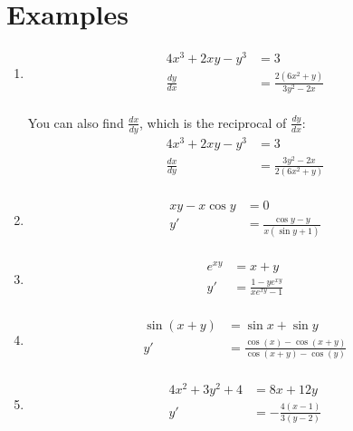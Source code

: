 \documentclass[letterpaper, landscape]{exam}
\begin{document}
  \newpage

  \section{Examples} %
  
  \begin{enumerate}
    \item 
      \begin{align*}
        4x^3 + 2xy - y^3 & = 3 \\
        \frac{dy}{dx}    & = \frac{2 \left(6x^2 + y\right)}{3 y^2 - 2x } \\
      \end{align*}

      You can also find $\frac{dx}{dy}$, which is the reciprocal of $\frac{dy}{dx}$:
      \begin{align*}
        4x^3 + 2xy - y^3 & = 3 \\
        \frac{dx}{dy}    & = \frac{3 y^2 - 2x}{2 \left( 6x^2 + y \right)} \\
      \end{align*}

    \item 
      \begin{align*}
        xy - x \cos y & = 0 \\
        y'            & = \frac{\cos y - y}{x (\sin y + 1)} \\
      \end{align*}
      
    \item 
      \begin{align*}
        e^{xy} & = x + y \\
        y'     & = \frac{1 - y e^{x y}}{x e^{x y} - 1} \\
      \end{align*}

    \item 
      \begin{align*}
        \sin(x + y) & = \sin x + \sin y \\
        y'          & = \frac{\cos (x) - \cos (x + y)}{\cos (x + y) - \cos (y)} \\
      \end{align*}

    \item 
      \begin{align*}
        4x^2 + 3 y^2 + 4 & = 8x + 12 y \\
        y'               & = - \frac{4 (x - 1)}{3 (y - 2)} \\
      \end{align*}


\end{enumerate}
\end{document}
